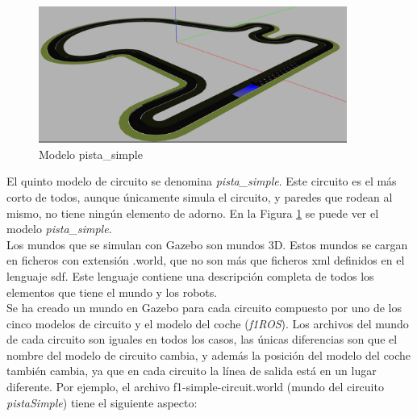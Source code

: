 \begin{figure}
  \begin{center}
    \includegraphics[width=0.9\textwidth]{figures/Infraestructura/circuit_Small.png}
		\caption{Modelo pista\_simple}
		\label{fig.small}
		\end{center}
\end{figure}

El quinto modelo de circuito se denomina \textit{pista\_simple}. Este circuito es el más corto de todos, aunque únicamente simula el circuito, y paredes que rodean al mismo, no tiene ningún elemento de adorno. En la Figura \ref{fig.small} se puede ver el modelo \textit{pista\_simple}.\\


Los mundos que se simulan con Gazebo son mundos 3D. Estos mundos se cargan en ficheros con extensión .world, que no son más que ficheros \acrshort{xml} definidos en el lenguaje \acrshort{sdf}. Este lenguaje contiene una descripción completa de todos los elementos que tiene el mundo y los robots.\\

Se ha creado un mundo en Gazebo para cada circuito compuesto por uno de los cinco modelos de circuito y el modelo del coche (\textit{f1ROS}). Los archivos del mundo de cada circuito son iguales en todos los casos, las únicas diferencias son que el nombre del modelo de circuito cambia, y además la posición del modelo del coche también cambia, ya que en cada circuito la línea de salida está en un lugar diferente. Por ejemplo, el archivo f1-simple-circuit.world (mundo del circuito \textit{pistaSimple}) tiene el
siguiente aspecto:

